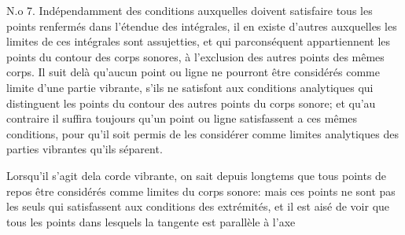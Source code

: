 \documentclass[11pt,a4paper]{article}
\begin{document}
N.o 7. Indépendamment des conditions auxquelles doivent satisfaire
tous les points renfermés dans l'étendue des intégrales,
il en existe d'autres auxquelles les limites de ces intégrales
sont assujetties, et qui parconséquent appartiennent   les
points du contour des corps sonores, à l'exclusion des autres
points des mêmes corps. Il suit delà qu'aucun point ou ligne
ne pourront   être considérés comme limite
d'une partie vibrante,  s'ils ne satisfont aux conditions
analytiques qui distinguent les points du contour des autres
points du corps sonore; et qu'au contraire il suffira toujours
qu'un point ou ligne satisfassent a ces mêmes conditions,
pour qu'il soit permis de les considérer comme limites
analytiques des parties vibrantes qu'ils séparent.

Lorsqu'il s'agit dela corde vibrante, on sait depuis longtems
que tous  points de repos   être considérés comme  limites du
corps sonore: mais ces points ne sont pas les seuls qui
satisfassent aux conditions des extrémités, et il est aisé de voir
que tous les points dans lesquels la tangente est parallèle à l'axe
\end{document}
